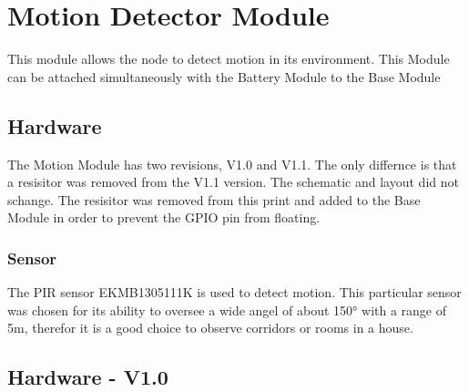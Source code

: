 \section{Motion Detector Module} 
This module allows the node to detect motion in its environment. This Module can be 
attached simultaneously with the Battery Module to the Base Module
\subsection {Hardware}
The Motion Module has two revisions, V1.0 and V1.1. The only differnce is that 
a resisitor was removed from the V1.1 version. The schematic and layout did not 
schange. The resisitor was removed from this print and added to the Base Module
in order to prevent the GPIO pin from floating.
\subsubsection{Sensor}
The PIR sensor EKMB1305111K is used to detect motion. This particular sensor was chosen
for its ability to oversee a wide angel of about 150° with a range of 5m, therefor it is
a good choice to observe corridors or rooms in a house.

\subsection {Hardware - V1.0}
